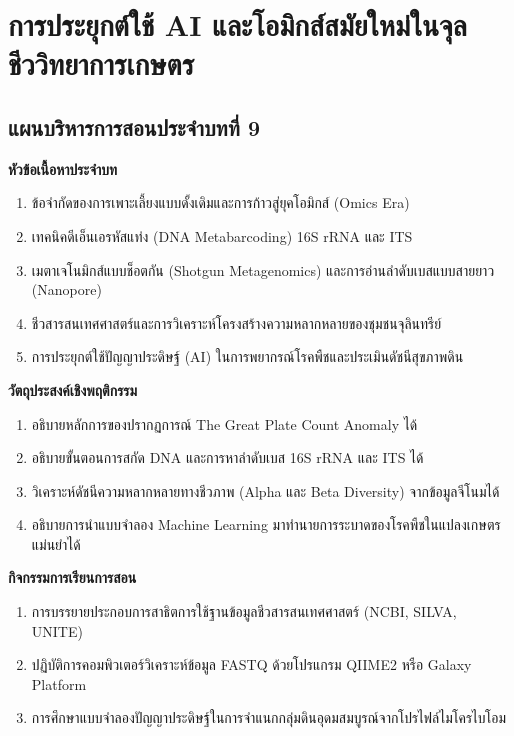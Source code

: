\chapter{การประยุกต์ใช้ AI และโอมิกส์สมัยใหม่ในจุลชีววิทยาการเกษตร}
\label{chap:ch09}

\section*{แผนบริหารการสอนประจำบทที่ 9}

\noindent\textbf{หัวข้อเนื้อหาประจำบท}
\begin{enumerate}
    \item ข้อจำกัดของการเพาะเลี้ยงแบบดั้งเดิมและการก้าวสู่ยุคโอมิกส์ (Omics Era)
    \item เทคนิคดีเอ็นเอรหัสแท่ง (DNA Metabarcoding) 16S rRNA และ ITS
    \item เมตาเจโนมิกส์แบบช็อตกัน (Shotgun Metagenomics) และการอ่านลำดับเบสแบบสายยาว (Nanopore)
    \item ชีวสารสนเทศศาสตร์และการวิเคราะห์โครงสร้างความหลากหลายของชุมชนจุลินทรีย์
    \item การประยุกต์ใช้ปัญญาประดิษฐ์ (AI) ในการพยากรณ์โรคพืชและประเมินดัชนีสุขภาพดิน
\end{enumerate}

\noindent\textbf{วัตถุประสงค์เชิงพฤติกรรม}
\begin{enumerate}
    \item อธิบายหลักการของปรากฏการณ์ The Great Plate Count Anomaly ได้
    \item อธิบายขั้นตอนการสกัด DNA และการหาลำดับเบส 16S rRNA และ ITS ได้
    \item วิเคราะห์ดัชนีความหลากหลายทางชีวภาพ (Alpha และ Beta Diversity) จากข้อมูลจีโนมได้
    \item อธิบายการนำแบบจำลอง Machine Learning มาทำนายการระบาดของโรคพืชในแปลงเกษตรแม่นยำได้
\end{enumerate}

\noindent\textbf{กิจกรรมการเรียนการสอน}
\begin{enumerate}
    \item การบรรยายประกอบการสาธิตการใช้ฐานข้อมูลชีวสารสนเทศศาสตร์ (NCBI, SILVA, UNITE)
    \item ปฏิบัติการคอมพิวเตอร์วิเคราะห์ข้อมูล FASTQ ด้วยโปรแกรม QIIME2 หรือ Galaxy Platform
    \item การศึกษาแบบจำลองปัญญาประดิษฐ์ในการจำแนกกลุ่มดินอุดมสมบูรณ์จากโปรไฟล์ไมโครไบโอม
\end{enumerate}

